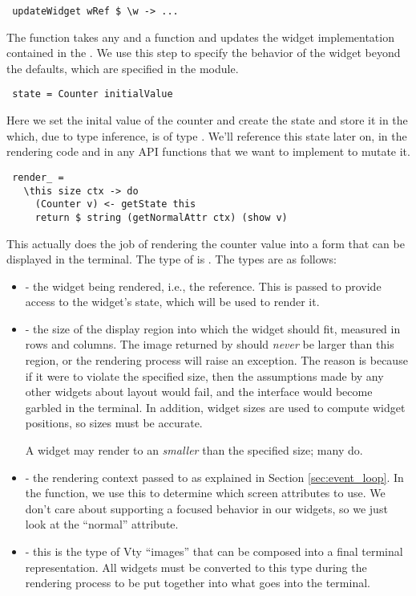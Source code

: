 \begin{verbatim}
 updateWidget wRef $ \w -> ...
\end{verbatim}

The  function takes any  and a function
 and updates the widget
implementation contained in the .  We use this step to
specify the behavior of the widget beyond the defaults, which are
specified in the  module.

\begin{verbatim}
 state = Counter initialValue
\end{verbatim}

Here we set the inital value of the counter and create the
 state and store it in the  which, due to
type inference, is of type .  We'll reference
this state later on, in the rendering code and in any API functions
that we want to implement to mutate it.

\begin{verbatim}
 render_ =
   \this size ctx -> do
     (Counter v) <- getState this
     return $ string (getNormalAttr ctx) (show v)
\end{verbatim}

This actually does the job of rendering the counter value into a form
that can be displayed in the terminal.  The type of  is
.  The
types are as follows:

\begin{itemize}
\item {} - the widget being rendered, i.e., the  reference.  This is passed to provide access to the
  widget's state, which will be used to render it.
\item {} - the size of the display region into which
  the widget should fit, measured in rows and columns.  The image
  returned by  should \textit{never} be larger than this
  region, or the rendering process will raise an exception.  The
  reason is because if it were to violate the specified size, then the
  assumptions made by any other widgets about layout would fail, and
  the interface would become garbled in the terminal.  In addition,
  widget sizes are used to compute widget positions, so sizes must be
  accurate.

  A widget may render to an  \textit{smaller} than the
  specified size; many do.
\item {} - the rendering context passed to 
  as explained in Section \ref{sec:event_loop}.  In the 
  function, we use this to determine which screen attributes to use.
  We don't care about supporting a focused behavior in our
   widgets, so we just look at the ``normal'' attribute.
\item {} - this is the type of Vty ``images'' that can be
  composed into a final terminal representation.  All widgets must be
  converted to this type during the rendering process to be put
  together into what goes into the terminal.
\end{itemize}

